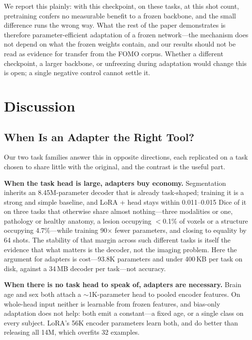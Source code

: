 \documentclass[journal,twoside,web]{ieeecolor}
\begin{document}
We report this plainly: with this checkpoint, on these tasks, at this shot count, pretraining confers no measurable benefit to a frozen backbone, and the small difference runs the wrong way. What the rest of the paper demonstrates is therefore parameter-efficient adaptation of a frozen network---the mechanism does not depend on what the frozen weights contain, and our results should not be read as evidence for transfer from the FOMO corpus. Whether a different checkpoint, a larger backbone, or unfreezing during adaptation would change this is open; a single negative control cannot settle it.



\section{Discussion}
\label{sec:discussion}

\subsection{When Is an Adapter the Right Tool?}
\label{sec:strengths}

Our two task families answer this in opposite directions, each replicated on a task chosen to share little with the original, and the contrast is the useful part.

\textbf{When the task head is large, adapters buy economy.} Segmentation inherits an 8.45M-parameter decoder that is already task-shaped; training it is a strong and simple baseline, and LoRA + head stays within 0.011--0.015 Dice of it on three tasks that otherwise share almost nothing---three modalities or one, pathology or healthy anatomy, a lesion occupying $<$0.1\% of voxels or a structure occupying 4.7\%---while training 90$\times$ fewer parameters, and closing to equality by 64 shots. The stability of that margin across such different tasks is itself the evidence that what matters is the decoder, not the imaging problem. Here the argument for adapters is cost---93.8K parameters and under 400\,KB per task on disk, against a 34\,MB decoder per task---not accuracy.

\textbf{When there is no task head to speak of, adapters are necessary.} Brain age and sex both attach a $\sim$1K-parameter head to pooled encoder features. On whole-head input neither is learnable from frozen features, and bias-only adaptation does not help: both emit a constant---a fixed age, or a single class on every subject. LoRA's 56K encoder parameters learn both, and do better than releasing all 14M, which overfits 32 examples.
\end{document}
